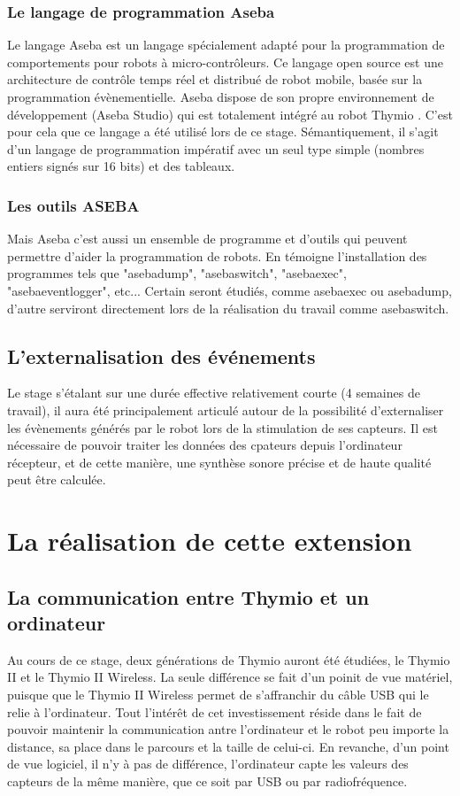 \documentclass[a4paper, 12pt]{report}
\begin{document}
\subsection{Le langage de programmation Aseba \pageref{aseba} }
\label{aseba}
Le langage Aseba \cite{ManualASEBA} est un langage spécialement adapté pour la programmation de comportements pour robots à micro-contrôleurs. Ce langage open source est une architecture de contrôle temps réel et distribué de robot mobile, basée sur la programmation évènementielle. Aseba dispose de son propre environnement de développement (Aseba Studio) qui est totalement intégré au robot Thymio \pageref{thymio}. C'est pour cela que ce langage a été utilisé lors de ce stage. Sémantiquement, il s'agit d'un langage de programmation impératif avec un seul type simple (nombres entiers signés sur 16 bits) et des tableaux.

\subsection{Les outils ASEBA}
Mais Aseba \pageref{aseba} c'est aussi un ensemble de programme et d'outils qui peuvent permettre d'aider la programmation de robots. En témoigne l'installation des programmes tels que "asebadump", "asebaswitch", "asebaexec", "asebaeventlogger", etc...
Certain seront étudiés, comme asebaexec ou asebadump, d'autre serviront directement lors de la réalisation du travail comme asebaswitch.

\section{L'externalisation des événements}
Le stage s'étalant sur une durée effective relativement courte (4 semaines de travail), il aura été principalement articulé autour de la possibilité d'externaliser les évènements générés par le robot lors de la stimulation de ses capteurs. Il est nécessaire de pouvoir traiter les données des cpateurs depuis l'ordinateur récepteur, et de cette manière, une synthèse sonore précise et de haute qualité peut être calculée.

\chapter{La réalisation de cette extension}
\section{La communication entre Thymio et un ordinateur}
Au cours de ce stage, deux générations de Thymio \pageref{thymio} auront été étudiées, le Thymio II et le Thymio II Wireless. La seule différence se fait d'un poinit de vue matériel, puisque que le Thymio II Wireless permet de s'affranchir du câble USB qui le relie à l'ordinateur. Tout l'intérêt de cet investissement réside dans le fait de pouvoir maintenir la communication antre l'ordinateur et le robot peu importe la distance, sa place dans le parcours et la taille de celui-ci. En revanche, d'un point de vue logiciel, il n'y à pas de différence, l'ordinateur capte les valeurs des capteurs de la même manière, que ce soit par USB ou par radiofréquence.
\end{document}
